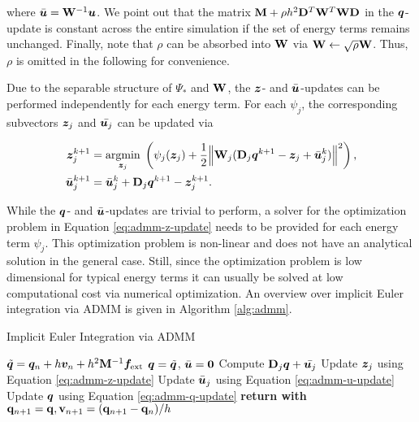 \noindent where $\bar{\bm{u}} = \mathbf{W}^{-1}\bm{u}$. We point out that the matrix $\mathbf{M} + \rho h^2 \mathbf{D}^T\mathbf{W}^T\mathbf{W}\mathbf{D}$ in the $\bm{q}$-update 
is constant across the entire simulation if the set of energy terms remains unchanged. Finally, note that $\rho$ can be absorbed into $\mathbf{W}$ via $\mathbf{W} \leftarrow 
\sqrt{\rho}\mathbf{W}$. Thus, $\rho$ is omitted in the following for convenience. 

Due to the separable structure of $\Psi_*$ and $\mathbf{W}$, the $\bm{z}$- and $\bar{\bm{u}}$-updates can be performed independently for each energy term. For each 
$\psi_j$, the corresponding subvectors $\bm{z}_j$ and $\bar{\bm{u}_j}$ can be updated via

\begin{align}
    \bm{z}^{k+1}_j &= \underset{\bm{z}_j}{\operatorname{argmin}}\; \left( \psi_j(\bm{z}_j) + \frac{1}{2}\norm{\mathbf{W}_j(\mathbf{D}_j\bm{q}^{k+1} - \bm{z}_j + \bar{\bm{u}}^k_j)}^2 \right), 
    \label{eq:admm-z-update} \\
    \bar{\bm{u}}^{k+1}_j &= \bar{\bm{u}}^k_j + \mathbf{D}_j{\bm{q}}^{k+1} - \bm{z}^{k+1}_j. \label{eq:admm-u-update}
\end{align}

\noindent While the $\bm{q}$- and $\bar{\bm{u}}$-updates are trivial to perform, a solver for the optimization problem in Equation \ref{eq:admm-z-update} needs to be 
provided for each energy term $\psi_j$. This optimization problem is non-linear and does not have an analytical solution in the general case. Still, since the optimization 
problem is low dimensional for typical energy terms it can usually be solved at low computational cost via numerical optimization. An overview over implicit Euler 
integration via ADMM is given in Algorithm \ref{alg:admm}.

\begin{algorithm}[t]
\caption{Implicit Euler Integration via ADMM}\label{alg:admm}
\begin{algorithmic}
\State $\tilde{\bm{q}} = \bm{q}_n + h\bm{v}_n + h^2\mathbf{M}^{-1}\bm{f}_{\text{ext}}$
\State $\bm{q} = \tilde{\bm{q}}$, $\bar{\bm{u}} = \bm{0}$
\State Compute $\mathbf{D}_j\bm{q} + \bar{\bm{u}_j}$
\State Update $\bm{z}_j$ using Equation \ref{eq:admm-z-update}
\State Update $\bar{\bm{u}}_j$ using Equation \ref{eq:admm-u-update}
\EndFor
\State Update $\bm{q}$ using Equation \ref{eq:admm-q-update}
\EndFor
\State \textbf{return with } $\mathbf{q}_{n+1} = \mathbf{q}, \mathbf{v}_{n+1} = (\mathbf{q}_{n+1} - \mathbf{q}_n) / h$
\EndProcedure
\end{algorithmic}
\end{algorithm}

